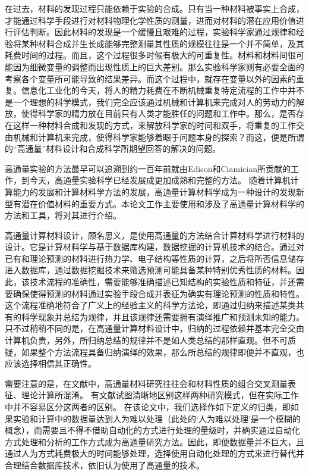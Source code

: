 在过去，材料的发现过程只能依赖于实验的合成。只有当一种材料被事实上合成，才能通过科学手段进行对材料物理化学性质的测量，进而对材料的潜在应用价值进行评估判断。因此材料的发现是一个缓慢且艰难的过程，实验科学家通过规律和经验将某种材料合成并生长成能够完整测量其性质的规模往往是一个并不简单，及其耗费时间的过程。而且，这个过程很多时候有极大的可重复性。材料和材料间很可能因为细微变量的调整而出现性质上的巨大差别。那么实验科学家则有必要全面的考察各个变量所可能导致的结果差异。而这个过程中，就存在变量以外的因素的重复。信息化工业化的今天，将人的精力耗费在不断机械重复特定流程的工作中并不是一个理想的科学模式，我们完全应该通过机械和计算机来完成对人的劳动力的解放，使得科学家的精力放在目前只有人类才能胜任的问题和工作中。那么，是否存在这样一种材料合成和发现的方式，来解放科学家的时间和双手，将重复的工作交由机械和计算机来完成，使得科学家能够着眼于问题本身的探索？而这，便是所谓的“高通量”材料设计和合成科学所期望回答的解决的问题。

高通量实验的方法最早可以追溯到约一百年前就由Edison和Ciamician\cite{ciamician1912photochemistry}所贡献的工作，到今天，高通量实验科学已经发展成更加成熟和完整的方法\cite{curtarolo2003predicting,ceder1998identification,johannesson2002combined,curtarolo2005accuracy,xiang1995combinatorial,koinuma2004combinatorial,takeuchi2003identification}。
随着计算机计算能力的发展和计算材料学方法的发展，高通量计算材料学成为一种设计的发现新型有潜在价值材料的重要方式。本论文工作主要使用和涉及了高通量计算材料学的方法和工具，将对其进行介绍。

高通量计算材料设计，顾名思义，是使用高通量的方法结合计算材料学进行材料的设计。它是计算材料学与基于数据库构建，数据挖掘的计算机技术的结合。通过对已有和理论预测的材料进行热力学、电子结构等性质的计算，之后将所否信息储存进入数据库，通过数据挖掘技术来筛选预测可能具备某种特别优秀性质的材料。因此，该技术流程的准确性，需要能够准确描述已知结构的实验性质和特征，并还需要确保使得预测的材料通过实验手段合成并表征为确实有理论预测的性质和特性。这个流程准确地符合了广义上的经验主义的科学方法论，即通过归纳来描述某类共有的科学现象并总结为规律，并且该规律还需要拥有演绎推广和预测未知的能力。只不过稍稍不同的是，在高通量计算材料设计中，归纳的过程依赖并基本完全交由计算机负责，另外，所归纳总结的规律并不是如人类总结的那样直观。但不可质疑，如果整个方法流程具备归纳演绎的效果，那么所总结的规律即便并不直观，也应该选择相信其正确性。

需要注意的是，在文献中，高通量材料研究往往会和材料性质的组合交叉测量表征、理论计算所混淆。
有文献\cite{maclean1999glossary,maier2007combinatorial}试图清晰地区别这样两种研究模式，但在实际工作中并不容易区分这两者的区别。
在该论文中，我们选择作如下定义的归类，即如果实验和计算中的数据量达到人为难以处理（此处的‘人为难以处理’是一个模糊的概念），而需要且不得不借助自动化的方式进行处理的量级时，并确实通过自动化方式处理和分析的工作方式成为高通量研究方法。因此，即便数据量并不巨大，且通过人为方式耗费极大的时间能够处理，选择使用自动化处理的方式来进行替代并合理结合数据库技术，依旧认为使用了高通量的技术。

